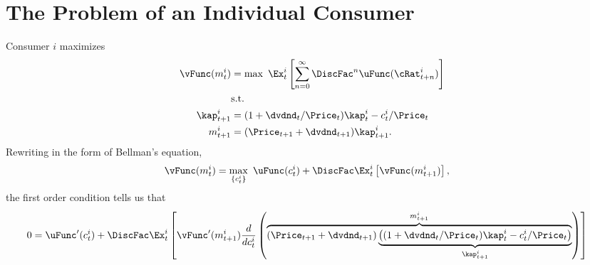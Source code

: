 \documentclass{handout}
\begin{document}
\section{The Problem of an Individual Consumer}
Consumer $i$ maximizes 
\begin{equation}\begin{gathered}\begin{aligned}
        \vFunc({m}_{t}^{i}) & =  \max ~ \Ex_{t}^{i}\left[\sum_{n=0}^{\infty} \DiscFac^{n} \uFunc(\cRat_{t+n}^{i}) \right]  \label{eq:origprob}
\\      & \text{s.t.}    \nonumber
\\  \kap_{t+1}^{i} & =  (1+\dvdnd_{t}/\Price_{t})\kap_{t}^{i}-c_{t}^{i}/\Price_{t} \notag
\\  {m}_{t+1}^{i} & =  (\Price_{t+1}+\dvdnd_{t+1})\kap_{t+1}^{i}. \notag
\end{aligned}\end{gathered}\end{equation}
Rewriting in the form of Bellman's equation,\hypertarget{Bellman}{}
\begin{equation*}\begin{gathered}\begin{aligned}
        \vFunc({m}_{t}^{i}) & =  \max_{\{c_{t}^{i}\}} ~ \uFunc(c_{t}^{i}) + \DiscFac \Ex_{t}^{i}\left[\vFunc({m}_{t+1}^{i})\right]
,
\end{aligned}\end{gathered}\end{equation*}
the first order condition tells us that 
\begin{equation}\begin{gathered}\begin{aligned}
        0 & =  \uFunc^{\prime}(c_{t}^{i})+\DiscFac \Ex_{t}^{i}\left[\vFunc^{\prime}({m}_{t+1}^{i})\frac{d}{dc_{t}^{i}}\left(\overbrace{({\Price}_{t+1}+\dvdnd_{t+1})\underbrace{\left((1+\dvdnd_{t}/\Price_{t})\kap_{t}^{i}-c_{t}^{i}/\Price_{t}\right)}_{\kap_{t+1}^{i}}}^{{m}_{t+1}^{i}}\right)\right] 
\end{aligned}\end{gathered}\end{equation} 
\end{document}
